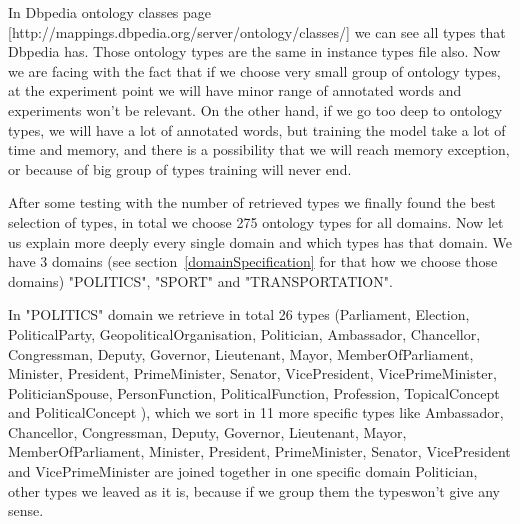 \documentclass[thesis=M,english]{FITthesis}[2018/05/30]
\begin{document}
In Dbpedia ontology classes page [http://mappings.dbpedia.org/server/ontology/classes/] we can see all types that Dbpedia has. Those ontology types are the same in instance types file also. Now we are facing with the fact that if we choose very small group of ontology types, at the experiment point we will have minor range of annotated words and experiments won't be relevant. On the other hand, if we go too deep to ontology types, we will have a lot of annotated words, but training the model take a lot of time and memory, and there is a possibility that we will reach memory exception, or because of big group of types training will never end.  

After some testing with the number of retrieved types we finally found the best selection of types, in total we choose 275 ontology types for all domains.
Now let us explain more deeply every single domain and which types has that domain. We have 3 domains (see section~\ref{domainSpecification} for that how we choose those domains) "POLITICS", "SPORT" and "TRANSPORTATION".

In "POLITICS" domain we retrieve in total 26 types (Parliament, Election, PoliticalParty, GeopoliticalOrganisation, Politician, Ambassador, Chancellor, Congressman, Deputy, Governor, Lieutenant, Mayor, MemberOfParliament, Minister, President, PrimeMinister, Senator, VicePresident, VicePrimeMinister, PoliticianSpouse, PersonFunction, PoliticalFunction, Profession, TopicalConcept and PoliticalConcept
), which we sort in 11 more specific types like Ambassador, Chancellor, Congressman, Deputy, Governor, Lieutenant, Mayor, MemberOfParliament, Minister, President, PrimeMinister, Senator, VicePresident and VicePrimeMinister are joined together in one specific domain Politician, other types we leaved as it is, because if we group them the typeswon't give any sense. 
\end{document}
